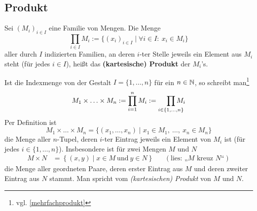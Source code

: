 \subsection*{Produkt}


\begin{defin}  
    Sei $(M_i)_{i\in I}$ eine Familie von Mengen. Die Menge
        \[ \prod_{i\in I} M_i := \{ (x_i)_{i\in I} \mid \forall i\in I:\ x_i\in M_i \} \]
    aller durch $I$ indizierten Familien, an deren $i$-ter Stelle jeweils ein Element aus $M_i$ steht (für jedes $i\in I$), heißt das \textbf{(kartesische) Produkt} der $M_i$'s.

    Ist die Indexmenge von der Gestalt $I=\{1,\dots , n\}$ für ein $n\in \mathbb N$, so schreibt man\footnote{vgl. \cref{mehrfachprodukt}}
        \[ M_1\times\ldots\times M_n := \prod_{i=1}^n M_i := \smashoperator[r]{\prod_{i\in \{1,\dots , n\}}} M_i   \]
    Per Definition ist
        \[ M_1\times\ldots\times M_n = \{ (x_1,\dots , x_n) \mid x_1\in M_1,\ \ldots,\ x_n\in M_n \} \]
    die Menge aller $n$-Tupel, deren $i$-ter Eintrag jeweils ein Element von $M_i$ ist (für jedes $i\in \{1,\dots , n\}$).
    Insbesondere ist für zwei Mengen $M$ und $N$
    \begin{align*}
        M \times N & = \left\{ (x,y) \mid x\in M\ \text{und}\ y\in N \right\}  && (\text{lies: „$M$ kreuz $N$“})
    \end{align*}
    die Menge aller geordneten Paare, deren erster Eintrag aus $M$ und deren zweiter Eintrag aus $N$ stammt. Man spricht vom \emph{(kartesischen) Produkt} von $M$ und $N$.
\end{defin}


